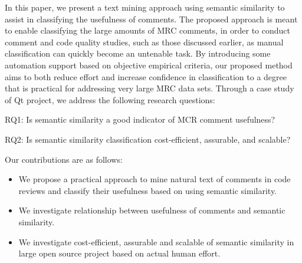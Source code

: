 



In this paper, we present a text mining approach using semantic similarity to assist in classifying the usefulness of comments.
The proposed approach is meant to enable classifying the large amounts of MRC comments, in order to conduct comment and code quality studies, such as those discussed earlier, as manual classification can quickly become an untenable task.
By introducing some automation support based on objective empirical criteria,
our proposed method aims to both reduce effort and increase confidence in classification to a degree that is practical for addressing very large MRC data sets.
Through a case study of Qt project, we address the following research questions:
\begin{ResearchQuestions}
\item[RQ1:] Is semantic similarity a good indicator of MCR comment usefulness?\\
\item[RQ2:] Is semantic similarity classification cost-efficient, assurable, and scalable?
\end{ResearchQuestions}

Our contributions are as follows:
\begin{itemize}
\item We propose a practical approach to mine natural text of comments in code reviews and classify their usefulness based on using semantic similarity.
\item We investigate relationship between usefulness of comments and semantic similarity.
\item We investigate cost-efficient, assurable and scalable of semantic similarity in large open source project based on actual human effort.
\end{itemize}


